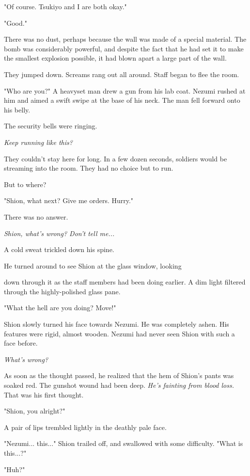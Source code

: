 "Of course. Tsukiyo and I are both okay."

"Good."

There was no dust, perhaps because the wall was made of a special
material. The bomb was considerably powerful, and despite the fact that
he had set it to make the smallest explosion possible, it had blown
apart a large part of the wall.

They jumped down. Screams rang out all around. Staff began to flee the
room.

"Who are you?" A heavyset man drew a gun from his lab coat. Nezumi
rushed at him and aimed a swift swipe at the base of his neck. The man
fell forward onto his belly.

The security bells were ringing.

\emph{Keep running like this?}

They couldn't stay here for long. In a few dozen seconds, soldiers would
be streaming into the room. They had no choice but to run.~

But to where?

"Shion, what next? Give me orders. Hurry."

There was no answer.

\emph{Shion, what's wrong? Don't tell me...}

A cold sweat trickled down his spine.

He turned around to see Shion at the glass window, looking~

down through it as the staff members had been doing earlier. A dim light
filtered through the highly-polished glass pane.

"What the hell are you doing? Move!"

Shion slowly turned his face towards Nezumi. He was completely ashen.
His features were rigid, almost wooden. Nezumi had never seen Shion with
such a face before.

\emph{What's wrong?}

As soon as the thought passed, he realized that the hem of Shion's pants
was soaked red. The gunshot wound had been deep. \emph{He's fainting from
	blood loss.} That was his first thought.

"Shion, you alright?"

A pair of lips trembled lightly in the deathly pale face.

"Nezumi... this..." Shion trailed off, and swallowed with some
difficulty. "What is this...?"

"Huh?"


